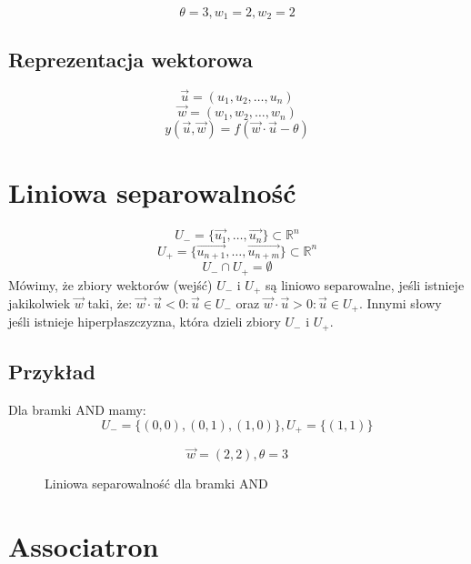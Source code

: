 \documentclass{../notatki}
\begin{document}
$$
\theta = 3, w_1 = 2, w_2 = 2
$$

\subsection{Reprezentacja wektorowa}

$$
\vec{u} = (u_1, u_2, \ldots, u_n)
$$
$$
\vec{w} = (w_1, w_2, \ldots, w_n)
$$
$$
y(\vec{u}, \vec{w}) = f(\vec{w} \cdot \vec{u} - \theta)
$$

\section{Liniowa separowalność}

$$
U_- = \{\vec{u_1}, \dots, \vec{u_n}\} \subset \mathbb{R}^n
$$
$$
U_+ = \{\vec{u_{n + 1}}, \dots, \vec{u_{n + m}}\} \subset \mathbb{R}^n
$$
$$
U_- \cap U_+ = \emptyset
$$
Mówimy, że zbiory wektorów (wejść) $U_-$ i $U_+$ są liniowo separowalne, jeśli
istnieje jakikolwiek $\vec{w}$ taki, że: $\vec{w} \cdot \vec{u} < 0:
\vec{u} \in U_-$ oraz $\vec{w} \cdot \vec{u} > 0: \vec{u} \in U_+$. Innymi słowy
jeśli istnieje hiperpłaszczyzna, która dzieli zbiory $U_-$ i $U_+$.

\subsection{Przykład}

Dla bramki AND mamy:
$$
U_- = \{(0, 0), (0, 1), (1, 0)\}, U_+ = \{(1, 1)\}
$$

$$
\vec{w} = (2, 2), \theta = 3
$$

\begin{figure*}[h]
  \centering
  \caption{Liniowa separowalność dla bramki AND}
\end{figure*}

\section{Associatron}
\end{document}
